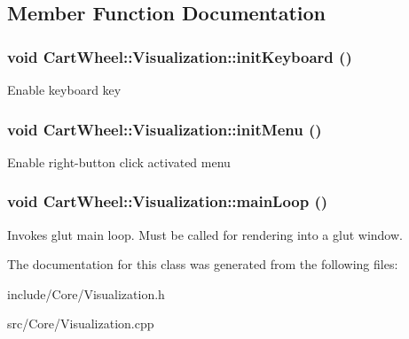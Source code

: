\subsection{Member Function Documentation}
\hypertarget{classCartWheel_1_1Visualization_a7f2f823f35e7533e696b615912a2b02b}{
\subsubsection[{initKeyboard}]{\setlength{\rightskip}{0pt plus 5cm}void CartWheel::Visualization::initKeyboard ()}}
\label{classCartWheel_1_1Visualization_a7f2f823f35e7533e696b615912a2b02b}
Enable keyboard key \hypertarget{classCartWheel_1_1Visualization_a07bb39cd884397b5be514ce2aa24ead5}{
\subsubsection[{initMenu}]{\setlength{\rightskip}{0pt plus 5cm}void CartWheel::Visualization::initMenu ()}}
\label{classCartWheel_1_1Visualization_a07bb39cd884397b5be514ce2aa24ead5}
Enable right-\/button click activated menu \hypertarget{classCartWheel_1_1Visualization_a67b0a21051ad5670a4fa6455674a290c}{
\subsubsection[{mainLoop}]{\setlength{\rightskip}{0pt plus 5cm}void CartWheel::Visualization::mainLoop ()}}
\label{classCartWheel_1_1Visualization_a67b0a21051ad5670a4fa6455674a290c}
Invokes glut main loop. Must be called for rendering into a glut window. 

The documentation for this class was generated from the following files:\begin{DoxyCompactItemize}
\item 
include/Core/Visualization.h\item 
src/Core/Visualization.cpp\end{DoxyCompactItemize}
